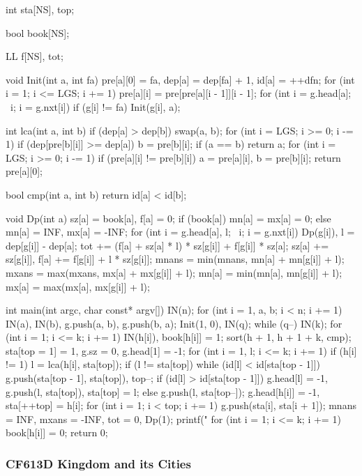 {\begin{cppcode}
int sta[NS], top;

bool book[NS];

LL f[NS], tot;

void Init(int a, int fa) {
  pre[a][0] = fa, dep[a] = dep[fa] + 1, id[a] = ++dfn;
  for (int i = 1; i <= LGS; i += 1) pre[a][i] = pre[pre[a][i - 1]][i - 1];
  for (int i = g.head[a]; ~i; i = g.nxt[i])
    if (g[i] != fa) Init(g[i], a);
}

int lca(int a, int b) {
  if (dep[a] > dep[b]) swap(a, b);
  for (int i = LGS; i >= 0; i -= 1)
    if (dep[pre[b][i]] >= dep[a]) b = pre[b][i];
  if (a == b) return a;
  for (int i = LGS; i >= 0; i -= 1)
    if (pre[a][i] != pre[b][i]) a = pre[a][i], b = pre[b][i];
  return pre[a][0];
}

bool cmp(int a, int b) { return id[a] < id[b]; }

void Dp(int a) {
  sz[a] = book[a], f[a] = 0;
  if (book[a])
    mn[a] = mx[a] = 0;
  else
    mn[a] = INF, mx[a] = -INF;
  for (int i = g.head[a], l; ~i; i = g.nxt[i]) {
    Dp(g[i]), l = dep[g[i]] - dep[a];
    tot += (f[a] + sz[a] * l) * sz[g[i]] + f[g[i]] * sz[a];
    sz[a] += sz[g[i]], f[a] += f[g[i]] + l * sz[g[i]];
    mnans = min(mnans, mn[a] + mn[g[i]] + l);
    mxans = max(mxans, mx[a] + mx[g[i]] + l);
    mn[a] = min(mn[a], mn[g[i]] + l);
    mx[a] = max(mx[a], mx[g[i]] + l);
  }
}

int main(int argc, char const* argv[]) {
  IN(n);
  for (int i = 1, a, b; i < n; i += 1) IN(a), IN(b), g.push(a, b), g.push(b, a);
  Init(1, 0), IN(q);
  while (q--) {
    IN(k);
    for (int i = 1; i <= k; i += 1) IN(h[i]), book[h[i]] = 1;
    sort(h + 1, h + 1 + k, cmp);
    sta[top = 1] = 1, g.sz = 0, g.head[1] = -1;
    for (int i = 1, l; i <= k; i += 1)
      if (h[i] != 1) {
        l = lca(h[i], sta[top]);
        if (l != sta[top]) {
          while (id[l] < id[sta[top - 1]])
            g.push(sta[top - 1], sta[top]), top--;
          if (id[l] > id[sta[top - 1]])
            g.head[l] = -1, g.push(l, sta[top]), sta[top] = l;
          else
            g.push(l, sta[top--]);
        }
        g.head[h[i]] = -1, sta[++top] = h[i];
      }
    for (int i = 1; i < top; i += 1) g.push(sta[i], sta[i + 1]);
    mnans = INF, mxans = -INF, tot = 0, Dp(1);
    printf("%
    for (int i = 1; i <= k; i += 1) book[h[i]] = 0;
  }
  return 0;
}
\end{cppcode}

\subsubsection{CF613D Kingdom and its Cities}

}
